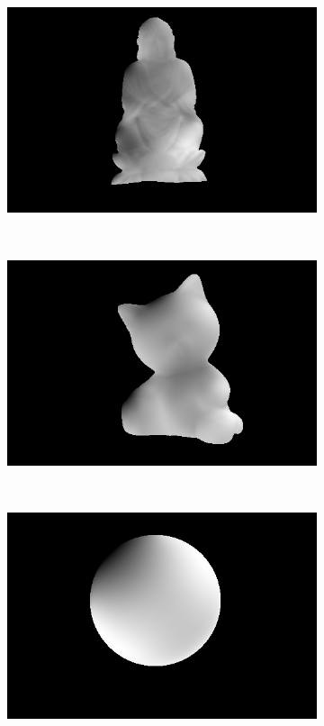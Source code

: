 \documentclass{paper}
\begin{document}
\begin{figure}[h!]
        \centering
        \begin{subfigure}{0.3\textwidth}
                \includegraphics[width=\textwidth]{report_fig/buddha_d}
        \end{subfigure}
        ~ 
        \begin{subfigure}{0.3\textwidth}
                \includegraphics[width=\textwidth]{report_fig/cat_d}
        \end{subfigure}
        ~ 
        \begin{subfigure}{0.3\textwidth}
                \includegraphics[width=\textwidth]{report_fig/gray_d}

\end{subfigure}
\end{figure}
\end{document}
